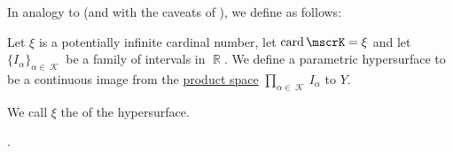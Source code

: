 \begin{definition}\label{def:parametric_hypersurface}
  In analogy to  (and with the caveats of ), we define  as follows:

  Let \( \xi \) is a potentially infinite cardinal number, let \( \card \mscrK = \xi \) and let \( \{ I_\alpha \}_{\alpha \in \mscrK} \) be a family of intervals in \( \BbbR \). We define a parametric hypersurface to be a continuous image from the \hyperref[def:topological_product]{product space} \( \prod_{\alpha \in \mscrK} I_\alpha \) to \( Y \).

  We call \( \xi \) the  of the hypersurface.
\end{definition}

\begin{definition}\label{def:fundamental_groupoid}
  .
\end{definition}

